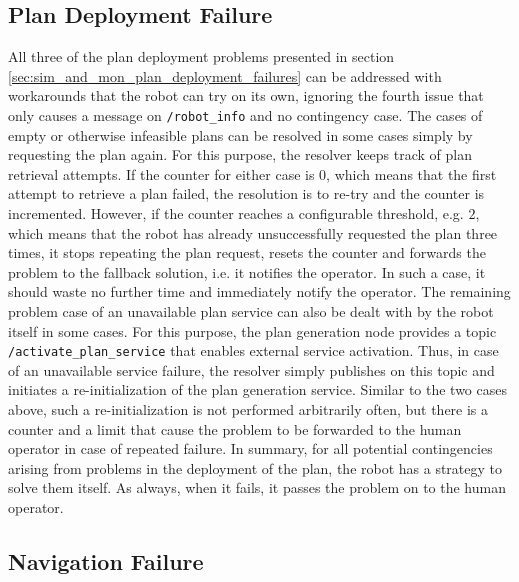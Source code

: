 \documentclass[english, master, utf8]{base/thesis_KBS}
\newcommand{\code}[1]{\colorbox{light-gray}{\texttt{#1}}}
\begin{document}
\subsection{Plan Deployment Failure}
\label{sec:plan_deployment_resolver}

All three of the plan deployment problems presented in section \ref{sec:sim_and_mon_plan_deployment_failures} can be addressed with workarounds that the robot can try
on its own, ignoring the fourth issue that only causes a message on \code{/robot\_info} and no contingency case. The cases of empty or otherwise infeasible plans can be resolved
in some cases simply by requesting the plan again. For this purpose, the resolver keeps track of plan retrieval attempts. If the counter for either case is $0$, which means that the
first attempt to retrieve a plan failed, the resolution is to re-try and the counter is incremented. However, if the counter reaches a configurable threshold, e.g. $2$, which means
that the robot has already unsuccessfully requested the plan three times, it stops repeating the plan request, resets the counter and forwards the problem to the fallback solution,
i.e. it notifies the operator. In such a case, it should waste no further time and immediately notify the operator. The remaining problem case of an unavailable plan service can also
be dealt with by the robot itself in some cases. For this purpose, the plan generation node provides a topic \code{/activate\_plan\_service} that enables external service activation.
Thus, in case of an unavailable service failure, the resolver simply publishes on this topic and initiates a re-initialization of the plan generation service. Similar to the two
cases above, such a re-initialization is not performed arbitrarily often, but there is a counter and a limit that cause the problem to be forwarded to the human operator in case of
repeated failure. In summary, for all potential contingencies arising from problems in the deployment of the plan, the robot has a strategy to solve them itself. As always, when it
fails, it passes the problem on to the human operator.

\subsection{Navigation Failure}
\label{sec:nav_fail_resolver}
\end{document}
